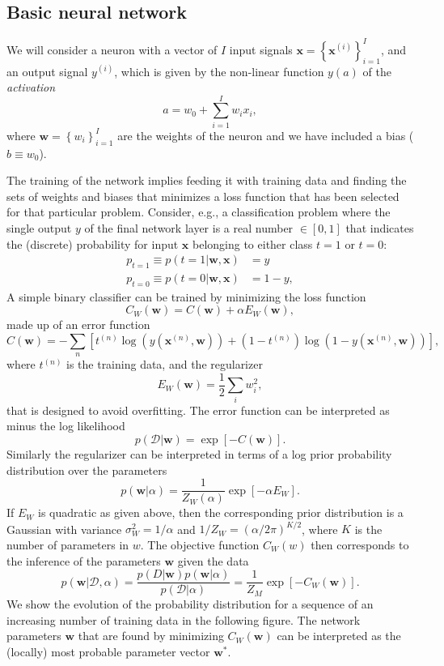 \documentclass[%
oneside,                 %
final,                   %
10pt]{article}
\begin{document}
\noindent
\subsection{Basic neural network}
We will consider a neuron with a vector of $I$ input signals $\boldsymbol{x} = \left\{ \boldsymbol{x}^{(i)} \right\}_{i=1}^I$, and an output signal $y^{(i)}$, which is given by the non-linear function $y(a)$ of the \emph{activation}
\[ a = w_0 +  \sum_{i=1}^I w_i x_i, \]
where $\boldsymbol{w} = \left\{ w_i \right\}_{i=1}^I$ are the weights of the neuron and we have included a bias ($b \equiv w_0$).

The training of the network implies feeding it with training data and finding the sets of weights and biases that minimizes a loss function that has been selected for that particular problem.
Consider, e.g., a classification problem where the single output $y$ of the final network layer is a real number $\in [0,1]$ that indicates the (discrete) probability for input $\boldsymbol{x}$ belonging to either class $t=1$ or $t=0$:
\begin{align}
p_{t=1} \equiv p(t=1 | \boldsymbol{w},\boldsymbol{x}) &= y \\
p_{t=0} \equiv p(t=0 | \boldsymbol{w},\boldsymbol{x}) &= 1-y,
\end{align}
A simple binary classifier can be trained by minimizing the loss function
\[ C_W(\boldsymbol{w}) = C(\boldsymbol{w}) +  \alpha E_W(\boldsymbol{w}), \]
made up of an error function
\[ C(\boldsymbol{w}) = -\sum_n \left[ t^{(n)} \log ( y(\boldsymbol{x}^{(n)},\boldsymbol{w})) + (1 - t^{(n)}) \log (1 - y(\boldsymbol{x}^{(n)},\boldsymbol{w})) \right], \]
where $t^{(n)}$ is the training data, and the regularizer
\[ E_W(\boldsymbol{w}) = \frac{1}{2} \sum_i w_i^2, \]
that is designed to avoid overfitting.
The error function can be interpreted as minus the log likelihood
\[ p(\mathcal{D}|\boldsymbol{w}) = \exp\left[ - C(\boldsymbol{w}) \right]. \]
Similarly the regularizer can be interpreted in terms of a log prior probability distribution over the parameters
\[ p(\boldsymbol{w} | \alpha) = \frac{1}{Z_W(\alpha)} \exp \left[ -\alpha E_W \right]. \]
If $E_W$ is quadratic as given above, then the corresponding prior distribution is a Gaussian with variance $\sigma_W^2 = 1/\alpha$ and $1/Z_W = (\alpha/2\pi)^{K/2}$, where $K$ is the number of parameters in $w$.
The objective function $C_W(w)$ then corresponds to the inference of the parameters $\boldsymbol{w}$ given the data
\[ p(\boldsymbol{w} | \mathcal{D}, \alpha) = \frac{p(D|\boldsymbol{w}) p(\boldsymbol{w}|\alpha)}{p(\mathcal{D}|\alpha)} = \frac{1}{Z_M} \exp [ -C_W(\boldsymbol{w}) ]. \]
We show the evolution of the probability distribution for a sequence of an increasing number of training data in the following figure. The network parameters $\boldsymbol{w}$ that are found by minimizing $C_W(\boldsymbol{w})$ can be interpreted as the (locally) most probable parameter vector $\boldsymbol{w}^*$.
\end{document}
